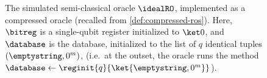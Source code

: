      \begin{figure}[t]
        \centering
        \begin{pchstack}[center]
          

        \end{pchstack}
        \caption{
          \label{fig:semiclassical-oracle}
          The simulated semi-classical oracle $\idealRO$, implemented as a compressed
          oracle (recalled from \cref{def:compressed-ros}). Here, $\bitreg$ is a
          single-qubit register initialized to $\ket 0$, and $\database$ is
          the database, initialized to the list of $q$ identical tuples
          $(\emptystring, 0^m)$, (i.e.\ at the outset, the oracle runs the method
          $\database \gets \reginit{q}{\ket{\emptystring, 0^m}}$). 
        }
      \end{figure}

